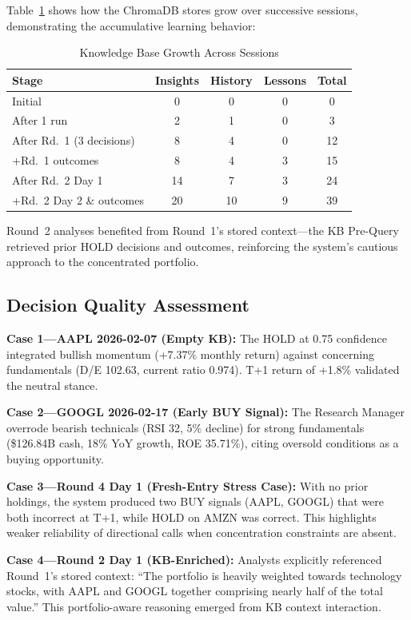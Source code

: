 \documentclass[conference]{IEEEtran}
\begin{document}
Table~\ref{tab:kbgrowth} shows how the ChromaDB stores grow over successive sessions, demonstrating the accumulative learning behavior:

\begin{table}[htbp]
\caption{Knowledge Base Growth Across Sessions}
\label{tab:kbgrowth}
\centering
\footnotesize
\begin{tabular}{@{}lcccc@{}}
\toprule
\textbf{Stage} & \textbf{Insights} & \textbf{History} & \textbf{Lessons} & \textbf{Total} \\
\midrule
Initial & 0 & 0 & 0 & 0 \\
After 1 run & 2 & 1 & 0 & 3 \\
After Rd.\ 1 (3 decisions) & 8 & 4 & 0 & 12 \\
+Rd.\ 1 outcomes & 8 & 4 & 3 & 15 \\
After Rd.\ 2 Day 1 & 14 & 7 & 3 & 24 \\
+Rd.\ 2 Day 2 \& outcomes & 20 & 10 & 9 & 39 \\
\bottomrule
\end{tabular}
\end{table}

Round~2 analyses benefited from Round~1's stored context---the KB Pre-Query retrieved prior HOLD decisions and outcomes, reinforcing the system's cautious approach to the concentrated portfolio.

\subsection{Decision Quality Assessment}

\textbf{Case 1---AAPL 2026-02-07 (Empty KB):} The HOLD at 0.75 confidence integrated bullish momentum (+7.37\% monthly return) against concerning fundamentals (D/E 102.63, current ratio 0.974). T+1 return of +1.8\% validated the neutral stance.

\textbf{Case 2---GOOGL 2026-02-17 (Early BUY Signal):} The Research Manager overrode bearish technicals (RSI 32, 5\% decline) for strong fundamentals (\$126.84B cash, 18\% YoY growth, ROE 35.71\%), citing oversold conditions as a buying opportunity.

\textbf{Case 3---Round 4 Day 1 (Fresh-Entry Stress Case):} With no prior holdings, the system produced two BUY signals (AAPL, GOOGL) that were both incorrect at T+1, while HOLD on AMZN was correct. This highlights weaker reliability of directional calls when concentration constraints are absent.

\textbf{Case 4---Round 2 Day 1 (KB-Enriched):} Analysts explicitly referenced Round~1's stored context: ``The portfolio is heavily weighted towards technology stocks, with AAPL and GOOGL together comprising nearly half of the total value.'' This portfolio-aware reasoning emerged from KB context interaction.
\end{document}
